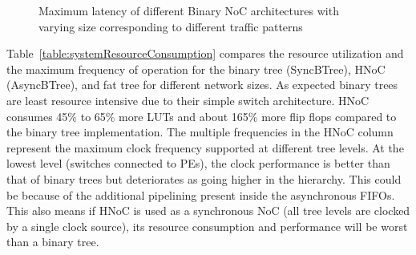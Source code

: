 \begin{figure}[t]
\centering     %
{}
\vspace{-3mm}
\caption{Maximum latency of different Binary NoC architectures with varying size corresponding to different traffic patterns}
\label{fig:latency}
\vspace{-5mm}
\end{figure}


Table~\ref{table:systemResourceConsumption} compares the resource utilization and the maximum frequency of operation for the binary tree (SyncBTree), HNoC (AsyncBTree), and fat tree for different network sizes.
As expected binary trees are least resource intensive due to their simple switch architecture.
HNoC consumes 45\% to 65\% more LUTs and about 165\% more flip flops compared to the binary tree implementation.
The multiple frequencies in the HNoC column represent the maximum clock frequency supported at different tree levels.
At the lowest level (switches connected to PEs), the clock performance is better than that of binary trees but deteriorates as going higher in the hierarchy.
This could be because of the additional pipelining present inside the asynchronous FIFOs.
This also means if HNoC is used as a synchronous NoC (all tree levels are clocked by a single clock source), its resource consumption and performance will be worst than a binary tree. 

